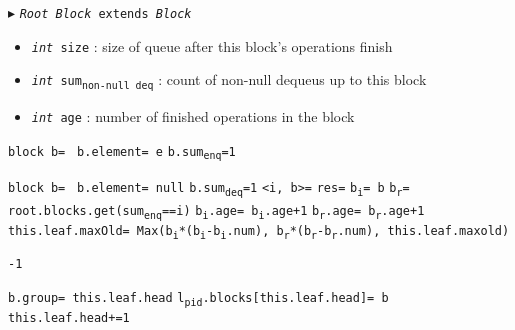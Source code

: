 \documentclass[10pt]{article}
\theoremstyle{definition}
\begin{document}
\begin{algorithm}
\begin{algorithmic}[1]
\begin{multicols}{2}
\Statex $\blacktriangleright$ \texttt{\textsl{Root Block} extends \textsl{Block}}
\begin{itemize}
  \item \texttt{\textsl{int} size}
  \textsf{: size of queue after this block's operations finish}
  \item \texttt{\textsl{int} sum\textsubscript{non-null deq}}
  \textsf{: count of non-null dequeus up to this block}
  \item \texttt{\textsl{int} age}
  \textsf{: number of finished operations in the block}
\end{itemize}

\Statex

\State \texttt{block b= }
\State \texttt{b.element= e}
\State \texttt{b.sum\textsubscript{enq}=1}
\State {}

\Statex

\State \texttt{block b= }
\State \texttt{b.element= null}
\State \texttt{b.sum\textsubscript{deq}=1}
\State {}
\State \texttt{<i, b>=} 
\State \texttt{res=}   \label{deqRest}
\State \Return {}
\State \texttt{b\textsubscript{i}= b}
\State \texttt{b\textsubscript{r}= root.blocks.get(sum\textsubscript{enq}==i)}
\State \texttt{b\textsubscript{i}.age= b\textsubscript{i}.age+1}
\State \texttt{b\textsubscript{r}.age= b\textsubscript{r}.age+1}
\State \texttt{this.leaf.maxOld= Max(b\textsubscript{i}*(b\textsubscript{i}-b\textsubscript{i}.num), b\textsubscript{r}*(b\textsubscript{r}-b\textsubscript{r}.num), this.leaf.maxold)}
\EndIf
{}

\Statex

\State \Return \texttt{-1}
\EndIf
{}

\Statex

\State \texttt{b.group= this.leaf.head}
\State \texttt{l\textsubscript{pid}.blocks[this.leaf.head]= b}
\State \texttt{this.leaf.head+=1}
\State {} 

\end{multicols}
\end{algorithmic}
\end{algorithm}
\end{document}
